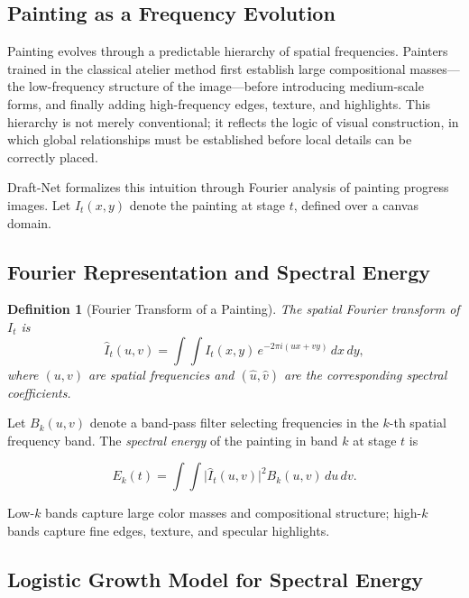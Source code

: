 \documentclass[12pt,a4paper]{article}
\theoremstyle{draftthm}
\newtheorem{definition}{Definition}[section]
\begin{document}
\subsection{Painting as a Frequency Evolution}

Painting evolves through a predictable hierarchy of spatial frequencies. Painters trained in the classical atelier method first establish large compositional masses---the low-frequency structure of the image---before introducing medium-scale forms, and finally adding high-frequency edges, texture, and highlights. This hierarchy is not merely conventional; it reflects the logic of visual construction, in which global relationships must be established before local details can be correctly placed.

Draft-Net formalizes this intuition through Fourier analysis of painting progress images. Let $I_t(x,y)$ denote the painting at stage $t$, defined over a canvas domain.

\subsection{Fourier Representation and Spectral Energy}

\begin{definition}[Fourier Transform of a Painting]
  The spatial Fourier transform of $I_t$ is
  \begin{equation}
    \hat{I}_t(u,v) = \int\!\!\int I_t(x,y)\, e^{-2\pi i(ux+vy)}\, dx\, dy,
  \end{equation}
  where $(u,v)$ are spatial frequencies and $(\hat{u},\hat{v})$ are the corresponding spectral coefficients.
\end{definition}

Let $B_k(u,v)$ denote a band-pass filter selecting frequencies in the $k$-th spatial frequency band. The \emph{spectral energy} of the painting in band $k$ at stage $t$ is

\begin{equation}
  E_k(t) = \int\!\!\int \bigl|\hat{I}_t(u,v)\bigr|^2 B_k(u,v)\, du\, dv.
  \label{eq:spectral-energy}
\end{equation}

Low-$k$ bands capture large color masses and compositional structure; high-$k$ bands capture fine edges, texture, and specular highlights.

\subsection{Logistic Growth Model for Spectral Energy}
\end{document}
